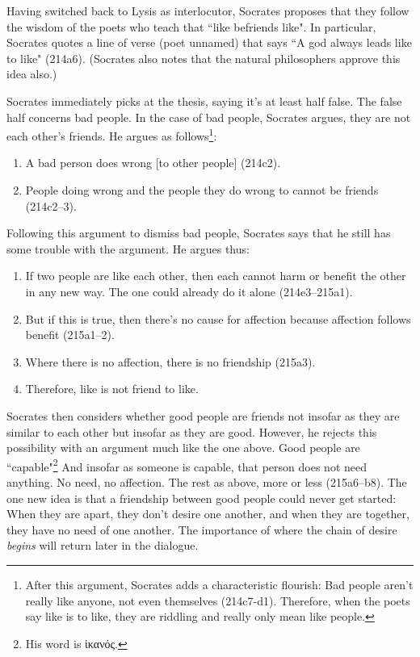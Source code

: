 \documentclass[11pt]{article}
\begin{document}
Having switched back to Lysis as interlocutor, Socrates proposes that they
follow the wisdom of the poets who teach that ``like befriends like".  In
particular, Socrates quotes a line of verse (poet unnamed) that says ``A god
always leads like to like" (214a6).  (Socrates also notes that the natural
philosophers approve this idea also.)

Socrates immediately picks at the thesis, saying it's at least half false.  The
false half concerns bad people.  In the case of bad people, Socrates argues,
they are not each other's friends.  He argues as follows\footnote{After this
argument, Socrates adds a characteristic flourish: Bad people aren't really
like anyone, not even themselves (214c7-d1).  Therefore, when the poets say
like is to like, they are riddling and really only mean  like
people.}:

\begin{enumerate}

    \item A bad person does wrong [to other people] (214c2).

    \item People doing wrong and the people they do wrong to cannot be friends
        (214c2--3).

\end{enumerate}

Following this argument to dismiss bad people, Socrates says that he still has
some trouble with the argument.  He argues thus:

\begin{enumerate}

    \item If two people are like each other, then each cannot harm or benefit
        the other in any new way.  The one could already do it alone
        (214e3--215a1).

    \item But if this is true, then there's no cause for affection because
        affection follows benefit (215a1--2).

    \item Where there is no affection, there is no friendship (215a3).

    \item Therefore, like is not friend to like.

\end{enumerate}

Socrates then considers whether good people are friends not insofar as they are
similar to each other but insofar as they are good.  However, he rejects this
possibility with an argument much like the one above.  Good people are
``capable"\footnote{His word is {\g ἱκανός}.}  And insofar as someone is
capable, that person does not need anything.  No need, no affection.  The rest
as above, more or less (215a6--b8).  The one new idea is that a friendship
between good people could never get started: When they are apart, they don't
desire one another, and when they are together, they have no need of one
another.  The importance of where the chain of desire \emph{begins} will return
later in the dialogue.
\end{document}
